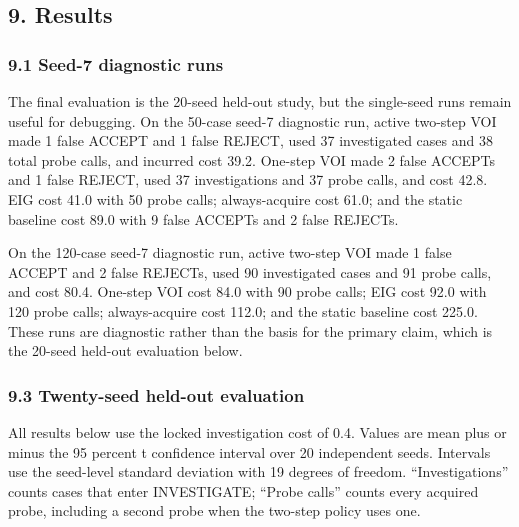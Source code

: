 \documentclass[
]{article}
\begin{document}
\subsection{9. Results}\label{9-results}

\subsubsection{9.1 Seed-7 diagnostic runs}\label{91-seed-7-diagnostic-runs}

The final evaluation is the 20-seed held-out study, but the single-seed runs remain useful for debugging. On the 50-case seed-7 diagnostic run, active two-step VOI made 1 false ACCEPT and 1 false REJECT, used 37 investigated cases and 38 total probe calls, and incurred cost 39.2. One-step VOI made 2 false ACCEPTs and 1 false REJECT, used 37 investigations and 37 probe calls, and cost 42.8. EIG cost 41.0 with 50 probe calls; always-acquire cost 61.0; and the static baseline cost 89.0 with 9 false ACCEPTs and 2 false REJECTs.

On the 120-case seed-7 diagnostic run, active two-step VOI made 1 false ACCEPT and 2 false REJECTs, used 90 investigated cases and 91 probe calls, and cost 80.4. One-step VOI cost 84.0 with 90 probe calls; EIG cost 92.0 with 120 probe calls; always-acquire cost 112.0; and the static baseline cost 225.0. These runs are diagnostic rather than the basis for the primary claim, which is the 20-seed held-out evaluation below.

\subsubsection{9.3 Twenty-seed held-out evaluation}\label{93-twenty-seed-held-out-evaluation}

All results below use the locked investigation cost of 0.4. Values are mean plus or minus the 95 percent t confidence interval over 20 independent seeds. Intervals use the seed-level standard deviation with 19 degrees of freedom. ``Investigations'' counts cases that enter INVESTIGATE; ``Probe calls'' counts every acquired probe, including a second probe when the two-step policy uses one.
\end{document}
